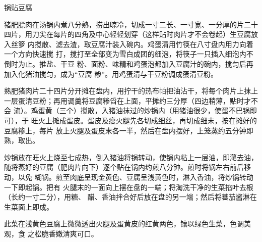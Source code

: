 \begin{recipe}{锅贴豆腐}

\ingredients


\preparation

\step 猪肥膘肉在汤锅内煮八分熟，捞出晾冷，切成一寸二长、一寸宽、一分厚的片二十
四片，用刀尖在每片的四角及中心轻轻划穿（这样贴时肉片才不会卷起）生豆腐放入丝箩
内搅散、滤去渣，取豆腐汁装入碗内。鸡蛋清用竹筷在八寸盘内用力向着一个方向快速搅
打，搅打至全部变为雪白成团的细泡，将筷子一只插入细泡内不倒时为止。推盐、干豆
粉、面粉、味精和鸡蛋泡都加入豆腐汁的碗内，搅匀后再加入化猪油搅匀，成为“豆腐
糁”。用鸡蛋清与干豆粉调成蛋清豆粉。

\step 熟肥猪肉片二十四片分开摊在盘内，用拧干的热布帕把油沾干，将每个肉片上抹上
一层蛋清豆粉；再用调羹将豆腐糁舀在上面，平摊约三分厚（四边稍薄，贴时才不会
流）。鸡蛋黄（三个）搅散，入猪油抹过的炒锅内（用猪油很少，使蛋不巴锅即可），于
旺火上摊成蛋皮。蛋皮及痩火腿先各切成细丝，再切成细末，按在摊好的豆腐糁上，每片
放上火腿及蛋皮末各一半，然后在盘内摆好，上笼蒸约五分钟即熟，取出。

\step 炒锅放在旺火上烧至七成热，倒入猪油将锅转动，使锅内粘上一层油，即滗去油，
随将蒸好的豆腐（肥肉片向下）逐个贴在锅内约煎八分钟。煎时将锅左右前后移动，以免
糊锅。煎至肉底呈现金黄色、豆腐呈浅黄色时，淋入香油，将炒锅转动一下即起锅。把有
火腿末的一面向上摆在盘的一端；将淘洗干净的生菜掐叶去根（长约一寸二分），用糖、
醋、香油拌合好后放在盘的另一端；然后将蕃茄酱淋在生菜面上即成。

\features

此菜在浅黄色豆腐上微微透出火腿及蛋黄皮的红黄两色，镶以绿色生菜，色调美观，食
之松脆香嫩清爽可口。

\end{recipe}

